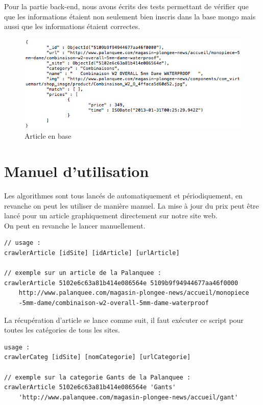 \documentclass{report}
\begin{document}
Pour la partie back-end, nous avons écrits des tests permettant de vérifier que que les informations étaient non seulement bien inscris dans la base mongo mais aussi que les informations étaient correctes.\\
\begin{figure}[h]
\begin{center}
\includegraphics[scale = 0.7]{./img/article.png}
\caption{Article en base}
\end{center}
\end{figure}

\chapter{Manuel d'utilisation}
Les algorithmes sont tous lancés de automatiquement et périodiquement, en revanche on peut les utiliser de manière manuel. La mise à jour du prix peut être lancé pour un article graphiquement directement sur notre site web.\\
On peut en revanche le lancer manuellement.
\begin{lstlisting}
// usage :
crawlerArticle [idSite] [idArticle] [urlArticle]

// exemple sur un article de la Palanquee :
crawlerArticle 5102e6c63a81b414e086564e 5109b9f94944677aa46f0000
	http://www.palanquee.com/magasin-plongee-news/accueil/monopiece
	-5mm-dame/combinaison-w2-overall-5mm-dame-waterproof
\end{lstlisting}

La récupération d'article se lance comme suit, il faut exécuter ce script pour toutes les catégories de tous les sites.
\begin{lstlisting}
usage :
crawlerCateg [idSite] [nomCategorie] [urlCategorie]

// exemple sur la categorie Gants de la Palanquee :
crawlerArticle 5102e6c63a81b414e086564e 'Gants'
	'http://www.palanquee.com/magasin-plongee-news/accueil/gant'
\end{lstlisting}
\end{document}
